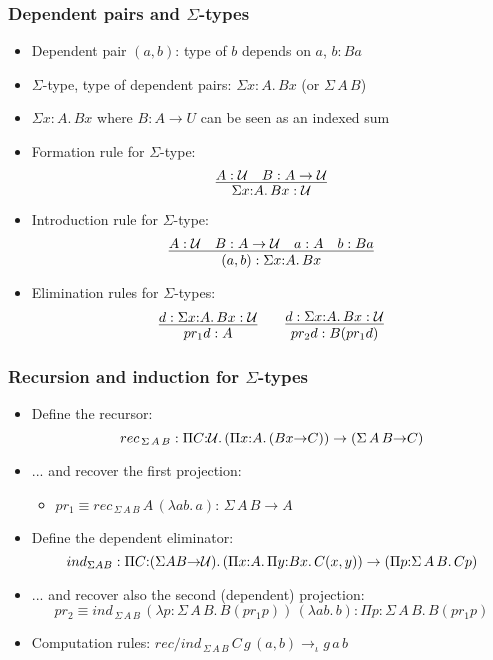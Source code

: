 \documentclass[handout]{beamer}
\newcommand{\depi}[3]{\Pi{#1{:}#2.\,#3}}
\newcommand{\sigm}[3]{\Sigma{#1{:}#2.\,#3}}
\newcommand{\lam}[2]{\lambda{#1.\,#2}}
\newcommand{\lamt}[3]{\lambda{#1{:}#2.\,#3}}
\newcommand{\UU}{{\cal U}}
\begin{document}
\frame
  {
  
    \frametitle{Dependent pairs and $\Sigma$-types}

    \begin{itemize}[<+->]
    \item Dependent pair $(a,b)$: type of $b$ depends on $a$, $b: Ba$
    \item $\Sigma$-type, type of dependent pairs: $\sigm{x}{A}{Bx}$ (or $\Sigma\,{A}\,{B}$)
    \item $\sigm{x}{A}{Bx}$ where $B:A\to U$ can be seen as an indexed sum 
    \item Formation rule for $\Sigma$-type:
\[\infer{\sigm{x}{A}{Bx}:\UU}{A:\UU \quad B : A\to \UU}\]
    \item Introduction rule for $\Sigma$-type:
\[\infer{(a,b):\sigm{x}{A}{Bx}}{A:\UU\quad B:A\to\UU\quad a:A \quad b:Ba}\]
    \item Elimination rules for $\Sigma$-types: 
\[\infer{pr_1 d:A}{d: \sigm{x}{A}{Bx}:\UU} \quad\quad \infer{pr_2 d:B(pr_1 d)}{d: \sigm{x}{A}{Bx}:\UU}\]
    \end{itemize}
  }
 
\frame
  {
  
    \frametitle{Recursion and induction for $\Sigma$-types}

    \begin{itemize}[<+->]
    \item Define the recursor:
$$rec_{\,\Sigma\,A\,B}:\depi{C}{\UU}{(\depi{x}{A}{(Bx{\to}C)})\to({\Sigma\,A\,B}{\to}C)}$$
    \item ... and recover the first projection:
       \begin{itemize}[<+->]
       \item $pr_1\equiv rec_{\,\Sigma\,A\,B}\,A\,(\lam{ab}{a}):\,\Sigma\,A\,B{\to}A$
       \end{itemize}
    \item Define the dependent eliminator:
$$ind_{\Sigma A B}:\depi{C}{(\Sigma A B{\to}\UU)}{(\depi{x}{A}{\depi{y}{Bx}{C(x,y)}})\to(\depi{p}{\Sigma\,A\,B}{Cp})}$$
    \item ... and recover also the second (dependent) projection:
$$pr_2\equiv ind_{\,\Sigma\,A\,B}\,(\lamt{p}{\Sigma\,A\,B}{B(pr_1p)})\,(\lam{ab}{b}):\depi{p}{\Sigma\,A\,B}{B(pr_1p)}$$
    \item Computation rules: $rec/ind_{\,\Sigma\,A\,B}\,C\,g\,(a,b) \to_\iota g\,a\,b$    
    \end{itemize}
  }
\end{document}

